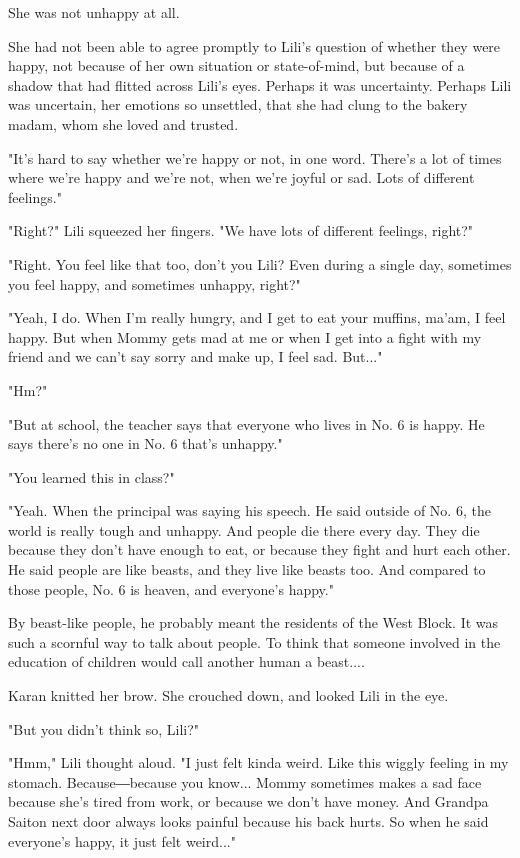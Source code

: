 She was not unhappy at all.

She had not been able to agree promptly to Lili's question of whether
they were happy, not because of her own situation or state-of-mind, but
because of a shadow that had flitted across Lili's eyes. Perhaps it was
uncertainty. Perhaps Lili was uncertain, her emotions so unsettled, that
she had clung to the bakery madam, whom she loved and trusted.

"It's hard to say whether we're happy or not, in one word. There's a lot
of times where we're happy and we're not, when we're joyful or sad. Lots
of different feelings."

"Right?" Lili squeezed her fingers. "We have lots of different feelings,
right?"

"Right. You feel like that too, don't you Lili? Even during a single
day, sometimes you feel happy, and sometimes unhappy, right?"

"Yeah, I do. When I'm really hungry, and I get to eat your muffins,
ma'am, I feel happy. But when Mommy gets mad at me or when I get into a
fight with my friend and we can't say sorry and make up, I feel sad.
But..."

"Hm?"

"But at school, the teacher says that everyone who lives in No. 6 is
happy. He says there's no one in No. 6 that's unhappy."

"You learned this in class?"

"Yeah. When the principal was saying his speech. He said outside of No.
6, the world is really tough and unhappy. And people die there every
day. They die because they don't have enough to eat, or because they
fight and hurt each other. He said people are like beasts, and they live
like beasts too. And compared to those people, No. 6 is heaven, and
everyone's happy."

By beast-like people, he probably meant the residents of the West Block.
It was such a scornful way to talk about people. To think that someone
involved in the education of children would call another human a
beast....

Karan knitted her brow. She crouched down, and looked Lili in the eye.

"But you didn't think so, Lili?"

"Hmm," Lili thought aloud. "I just felt kinda weird. Like this wiggly
feeling in my stomach. Because―because you know... Mommy sometimes makes
a sad face because she's tired from work, or because we don't have
money. And Grandpa Saiton next door always looks painful because his
back hurts. So when he said everyone's happy, it just felt weird..."

